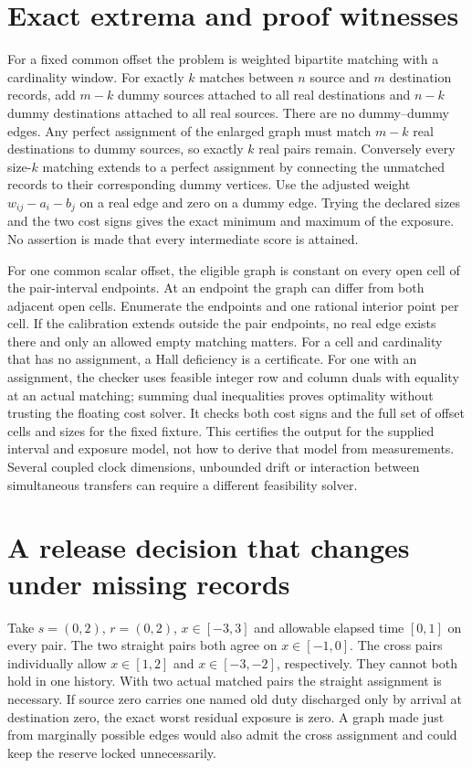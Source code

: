 \documentclass[11pt]{article}
\begin{document}
\section{Exact extrema and proof witnesses}
For a fixed common offset the problem is weighted bipartite
matching with a cardinality window. For exactly \(k\) matches
between \(n\) source and \(m\) destination records, add \(m-k\)
dummy sources attached to all real destinations and \(n-k\)
dummy destinations attached to all real sources. There are no
dummy--dummy edges. Any perfect assignment of the enlarged
graph must match \(m-k\) real destinations to dummy sources,
so exactly \(k\) real pairs remain. Conversely every size-\(k\)
matching extends to a perfect assignment by connecting the
unmatched records to their corresponding dummy vertices.
Use the adjusted weight \(w_{ij}-a_i-b_j\) on a real edge
and zero on a dummy edge. Trying the declared sizes and the
two cost signs gives the exact minimum and maximum of the
exposure. No assertion is made that every intermediate score
is attained.

For one common scalar offset, the eligible graph is constant
on every open cell of the pair-interval endpoints. At an
endpoint the graph can differ from both adjacent open cells.
Enumerate the endpoints and one rational interior point per cell.
If the calibration extends outside the pair endpoints, no
real edge exists there and only an allowed empty matching matters.
For a cell and cardinality that has no assignment, a Hall
deficiency is a certificate. For one with an assignment, the
checker uses feasible integer row and column duals with
equality at an actual matching; summing dual inequalities
proves optimality without trusting the floating cost solver.
It checks both cost signs and the full set of offset cells
and sizes for the fixed fixture. This certifies the output for
the supplied interval and exposure model, not how to derive
that model from measurements. Several coupled clock dimensions,
unbounded drift or interaction between simultaneous transfers
can require a different feasibility solver.

\section{A release decision that changes under missing records}
Take \(s=(0,2)\), \(r=(0,2)\), \(x\in[-3,3]\) and allowable
elapsed time \([0,1]\) on every pair. The two straight pairs
both agree on \(x\in[-1,0]\). The cross pairs individually
allow \(x\in[1,2]\) and \(x\in[-3,-2]\), respectively.
They cannot both hold in one history. With two actual
matched pairs the straight assignment is necessary. If
source zero carries one named old duty discharged only by
arrival at destination zero, the exact worst residual
exposure is zero. A graph made just from marginally possible
edges would also admit the cross assignment and could keep
the reserve locked unnecessarily.
\end{document}
